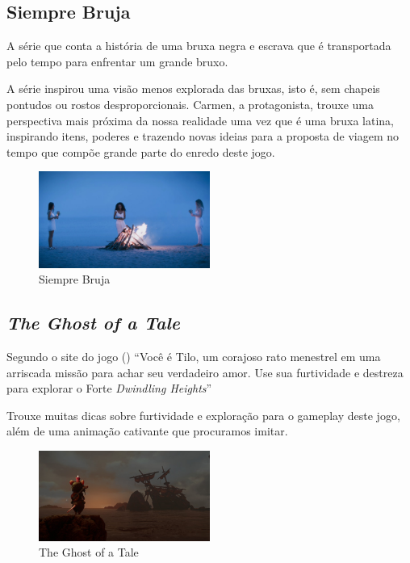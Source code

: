 \subsection{Siempre Bruja}

A série que conta a história de uma bruxa negra e escrava que é transportada pelo tempo para enfrentar um grande bruxo.

A série inspirou uma visão menos explorada das bruxas, isto é, sem chapeis pontudos ou rostos desproporcionais. Carmen, a protagonista, trouxe uma perspectiva mais próxima da nossa realidade uma vez que é uma bruxa latina, inspirando itens, poderes e trazendo novas ideias para a proposta de viagem no tempo que compõe grande parte do enredo deste jogo.

\begin{figure}[!htb] \caption{\label{siempre}Siempre Bruja} \begin{center}
\includegraphics[width=0.5\textwidth]{imagens/SiempreBruja.jpg} \end{center}
 \end{figure}


\subsection{\textit{The Ghost of a Tale}} Segundo o site do jogo (\citeyear{Ghostofa36:online})  ``Você é Tilo,
um corajoso rato menestrel em uma arriscada missão para achar seu verdadeiro
amor. Use sua furtividade e destreza para explorar o Forte \textit{Dwindling
Heights}''

Trouxe muitas dicas sobre furtividade e exploração para o gameplay deste jogo, além de uma animação cativante que procuramos imitar.

\begin{figure}[!htb] \caption{\label{tale}The Ghost of a Tale} \begin{center}
\includegraphics[width=0.5\textwidth]{imagens/tale.jpg} \end{center}
 \end{figure}

